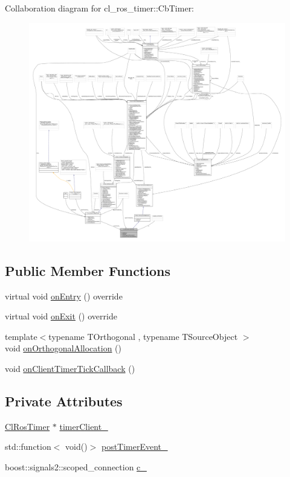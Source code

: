Collaboration diagram for cl\+\_\+ros\+\_\+timer\+:\+:Cb\+Timer\+:
\nopagebreak
\begin{figure}[H]
\begin{center}
\leavevmode
\includegraphics[width=350pt]{classcl__ros__timer_1_1CbTimer__coll__graph}
\end{center}
\end{figure}
\subsection*{Public Member Functions}
\begin{DoxyCompactItemize}
\item 
virtual void \hyperlink{classcl__ros__timer_1_1CbTimer_aceba45e86271cf1b7333e2f42c246a38}{on\+Entry} () override
\item 
virtual void \hyperlink{classcl__ros__timer_1_1CbTimer_a04184e2679c32363c876e1d6b4746072}{on\+Exit} () override
\item 
{\footnotesize template$<$typename T\+Orthogonal , typename T\+Source\+Object $>$ }\\void \hyperlink{classcl__ros__timer_1_1CbTimer_a517d01e1fc44729db8fcd347f17c414f}{on\+Orthogonal\+Allocation} ()
\item 
void \hyperlink{classcl__ros__timer_1_1CbTimer_a9895eb7e05a5922fa27f2bc46f5486a0}{on\+Client\+Timer\+Tick\+Callback} ()
\end{DoxyCompactItemize}
\subsection*{Private Attributes}
\begin{DoxyCompactItemize}
\item 
\hyperlink{classcl__ros__timer_1_1ClRosTimer}{Cl\+Ros\+Timer} $\ast$ \hyperlink{classcl__ros__timer_1_1CbTimer_aefff167dbfbc54485f700a2c6b2479a5}{timer\+Client\+\_\+}
\item 
std\+::function$<$ void()$>$ \hyperlink{classcl__ros__timer_1_1CbTimer_ad2b7913a84459d635fdcca8d346c7af2}{post\+Timer\+Event\+\_\+}
\item 
boost\+::signals2\+::scoped\+\_\+connection \hyperlink{classcl__ros__timer_1_1CbTimer_a2713f692e11ee82ea55080938d339881}{c\+\_\+}
\end{DoxyCompactItemize}
